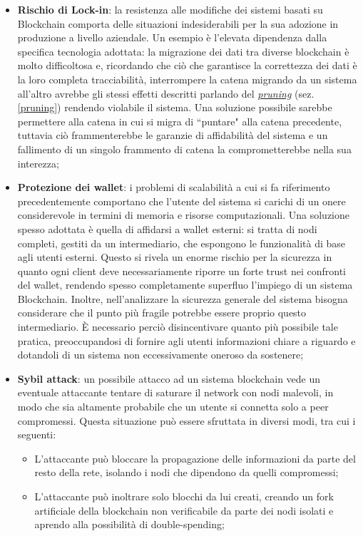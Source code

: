 \begin{itemize}
				\item \textbf{Rischio di Lock-in}: la resistenza alle modifiche dei sistemi basati su Blockchain comporta delle situazioni indesiderabili per la sua adozione in produzione a livello aziendale. Un esempio è l'elevata dipendenza dalla specifica tecnologia adottata: la migrazione dei dati tra diverse blockchain è molto difficoltosa e, ricordando che ciò che garantisce la correttezza dei dati è la loro completa tracciabilità, interrompere la catena migrando da un sistema all'altro avrebbe gli stessi effetti descritti parlando del \hyperref[pruning]{\emph{pruning}} (sez. \ref{pruning}) rendendo violabile il sistema. Una soluzione possibile sarebbe permettere alla catena in cui si migra di ``puntare" alla catena precedente, tuttavia ciò frammenterebbe le garanzie di affidabilità del sistema e un fallimento di un singolo frammento di catena la comprometterebbe nella sua interezza;
				\item \textbf{Protezione dei wallet}: i problemi di scalabilità a cui si fa riferimento precedentemente comportano che l'utente del sistema si carichi di un onere considerevole in termini di memoria e risorse computazionali. Una soluzione spesso adottata è quella di affidarsi a wallet esterni: si tratta di nodi completi, gestiti da un intermediario, che espongono le funzionalità di base agli utenti esterni. Questo si rivela un enorme rischio per la sicurezza in quanto ogni client deve necessariamente riporre un forte trust nei confronti del wallet, rendendo spesso completamente superfluo l'impiego di un sistema Blockchain. Inoltre, nell'analizzare la sicurezza generale del sistema bisogna considerare che il punto più fragile potrebbe essere proprio questo intermediario. È necessario perciò disincentivare quanto più possibile tale pratica, preoccupandosi di fornire agli utenti informazioni chiare a riguardo e dotandoli di un sistema non eccessivamente oneroso da sostenere;
				\item \textbf{Sybil attack}: un possibile attacco ad un sistema blockchain vede un eventuale attaccante tentare di saturare il network con nodi malevoli, in modo che sia altamente probabile che un utente si connetta solo a peer compromessi. Questa situazione può essere sfruttata in diversi modi, tra cui i seguenti:
				\begin{itemize}
					\item L'attaccante può bloccare la propagazione delle informazioni da parte del resto della rete, isolando i nodi che dipendono da quelli compromessi;
					\item L'attaccante può inoltrare solo blocchi da lui creati, creando un fork artificiale della blockchain non verificabile da parte dei nodi isolati e aprendo alla possibilità di double-spending;

\end{itemize}
\end{itemize}
